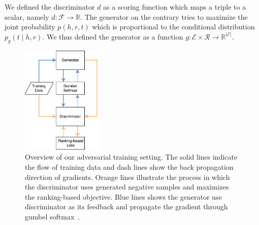 \documentclass[twocolumn,a4paper,preprint,10pt,3p]{elsarticle}
\begin{document}
We defined the discriminator $d$ as a scoring function which maps a triple to a scalar, namely $d: \mathcal{F}\rightarrow \mathbb{R}$. The generator on the contrary tries to maximize the joint probability $p(h, r, t)$ which is proportional to the conditional distribution $p_g(t \mid h, r)$. We thus defined the generator as a function $g: \mathcal{E} \times \mathcal{R} \rightarrow \mathbb{R}^{\lvert \mathcal{E} \rvert}$.

\begin{figure}[t]
    \centering
    \includegraphics[width=0.35\textwidth]{overview.pdf}
    \caption{Overview of our adversarial training setting. The solid lines indicate the flow of training data and dash lines show the back propagation direction of gradients. Orange lines illustrate the process in which the discriminator uses generated negative samples and maximizes the ranking-based objective. Blue lines shows the generator use discriminator as its feedback and propagate the gradient through gumbel softmax~\cite{GumbelSoftmax_Jiang_2016}.}
\label{system-overview}
\end{figure}
\end{document}

